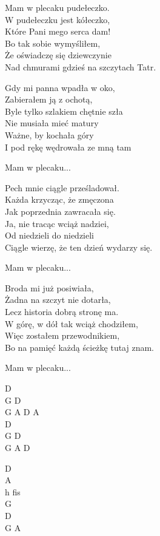 \begin{text}
    \vin Mam w plecaku pudełeczko.\\
    \vin W pudełeczku jest kółeczko,\\
    \vin Które Pani mego serca dam!\\
    \vin Bo tak sobie wymyśliłem,\\
    \vin Że oświadczę się dziewczynie\\
    \vin Nad chmurami gdzieś na szczytach Tatr.

    Gdy mi panna wpadła w oko,\\
    Zabierałem ją z ochotą,\\
    Byle tylko szlakiem chętnie szła\\
    Nie musiała mieć matury\\
    Ważne, by kochała góry\\
    I pod rękę wędrowała ze mną tam

    \vin Mam w plecaku...

    Pech mnie ciągle prześladował.\\
    Każda krzycząc, że zmęczona\\
    Jak poprzednia zawracała się.\\
    Ja, nie tracąc wciąż nadziei,\\
    Od niedzieli do niedzieli\\
    Ciągle wierzę, że ten dzień wydarzy się.

    \vin Mam w plecaku...

    Broda mi już posiwiała,\\
    Żadna na szczyt nie dotarła,\\
    Lecz historia dobrą stronę ma.\\
    W górę, w dół tak wciąż chodziłem,\\
    Więc zostałem przewodnikiem,\\
    Bo na pamięć każdą ścieżkę tutaj znam.

    \vin Mam w plecaku...


\end{text}
\begin{chord}
    D\\
    G D\\
    G A D A\\
    D\\
    G D\\
    G A D

    D\\
    A\\
    h fis\\
    G\\
    D\\
    G A

\end{chord}